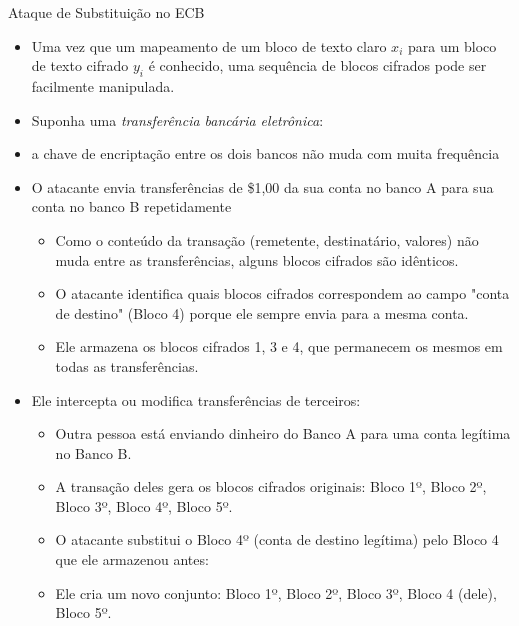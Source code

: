 \documentclass{beamer}
\begin{document}
\begin{frame}{Ataque de Substituição no ECB}

\begin{itemize}
    \item Uma vez que um mapeamento de um bloco de texto claro $x_i$ para um bloco de texto cifrado $y_i$ é conhecido, uma sequência de blocos cifrados pode ser facilmente manipulada.

    \item Suponha uma \textit{transferência bancária eletrônica}:
\end{itemize}


\begin{itemize}
    \item a chave de encriptação entre os dois bancos não muda com muita frequência

    \item O atacante envia transferências de \$1,00 da sua conta no banco A para sua conta no banco B repetidamente
    \begin{itemize}
        \tiny
        \item Como o conteúdo da transação (remetente, destinatário, valores) não muda entre as transferências, alguns blocos cifrados são idênticos.
        \item O atacante identifica quais blocos cifrados correspondem ao campo "conta de destino" (Bloco 4) porque ele sempre envia para a mesma conta.
        \item Ele armazena os blocos cifrados 1, 3 e 4, que permanecem os mesmos em todas as transferências.
    \end{itemize}

    \item Ele intercepta ou modifica transferências de terceiros:
        \begin{itemize}
            \tiny
            \item Outra pessoa está enviando dinheiro do Banco A para uma conta legítima no Banco B.
            \item A transação deles gera os blocos cifrados originais: Bloco 1º, Bloco 2º, Bloco 3º, Bloco 4º, Bloco 5º.
            \item O atacante substitui o Bloco 4º (conta de destino legítima) pelo Bloco 4 que ele armazenou antes:
            \item Ele cria um novo conjunto: Bloco 1º, Bloco 2º, Bloco 3º, Bloco 4 (dele), Bloco 5º.
    \end{itemize}
\end{itemize}

\end{frame}
\end{document}

